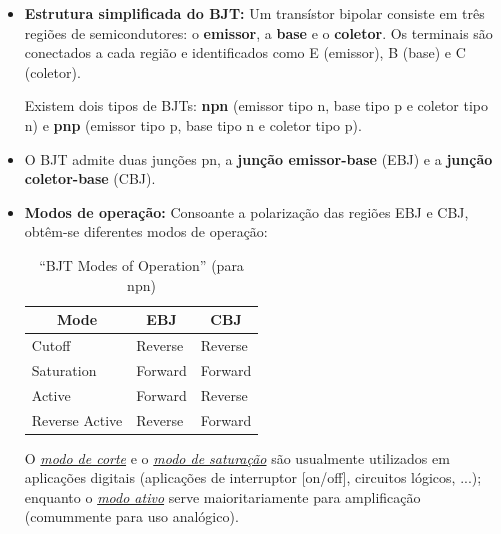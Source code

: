 \begin{itemize}[leftmargin=*]
    \item \textbf{Estrutura simplificada do BJT:} Um transístor bipolar consiste em três regiões de semicondutores: o \textbf{emissor}, a \textbf{base} e o \textbf{coletor}. Os terminais são conectados a cada região e identificados como E (emissor), B (base) e C (coletor). 
    
    Existem dois tipos de BJTs: \textbf{npn} (emissor tipo n, base tipo p e coletor tipo n) e \textbf{pnp} (emissor tipo p, base tipo n e coletor tipo p).
    
    \item O BJT admite duas junções pn, a \textbf{junção emissor-base} (EBJ) e a \textbf{junção coletor-base} (CBJ).
    
    \item \textbf{Modos de operação:} Consoante a polarização das regiões EBJ e CBJ, obtêm-se diferentes modos de operação:
    {
    \setlength{\tabcolsep}{14pt}
    
    \begin{table}[h!]
        \centering
        \captionsetup{justification=centering}
        \caption{``BJT Modes of Operation''\cite{sedra-smith:microelectronic-circuits} (para npn)}
        \label{tab:}
        \begin{tabularx}{0.55\textwidth}{lll}
            \toprule
            \multicolumn{1}{c}{\textbf{Mode}} & \multicolumn{1}{c}{\textbf{EBJ}} & \multicolumn{1}{c}{\textbf{CBJ}} \\
            \midrule
            Cutoff & Reverse & Reverse \\
            Saturation & Forward & Forward \\
            Active & Forward & Reverse \\
            \color{gray} Reverse Active & \color{gray} Reverse & \color{gray} Forward \\
            \bottomrule
        \end{tabularx}
    \end{table}
    }
    O \textit{\underline{modo de corte}} e o \textit{\underline{modo de saturação}} são usualmente utilizados em aplicações digitais (aplicações de interruptor $[$on/off$]$, circuitos lógicos, ...); enquanto o \textit{\underline{modo ativo}} serve maioritariamente para amplificação (comummente para uso analógico).
\end{itemize}

